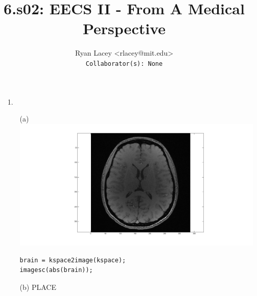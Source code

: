 \documentclass{article}
\begin{document}

\title{6.s02: EECS II - From A Medical Perspective}
\author{
  Ryan Lacey <rlacey@mit.edu>\\
  \footnotesize \texttt{Collaborator(s): None}
}
        
\maketitle
        

\begin{enumerate}
\item[1.]
	\begin{enumerate}
	\item[(a)]
		$\;$\\ \includegraphics[width=\textwidth]{../images/GrayscaleBrain} \\
\begin{lstlisting}   
brain = kspace2image(kspace); 
imagesc(abs(brain));
\end{lstlisting}

\bigskip
\bigskip

	\item[(b)]
	PLACE\\

\newpage


\end{enumerate}
\end{enumerate}
\end{document}
